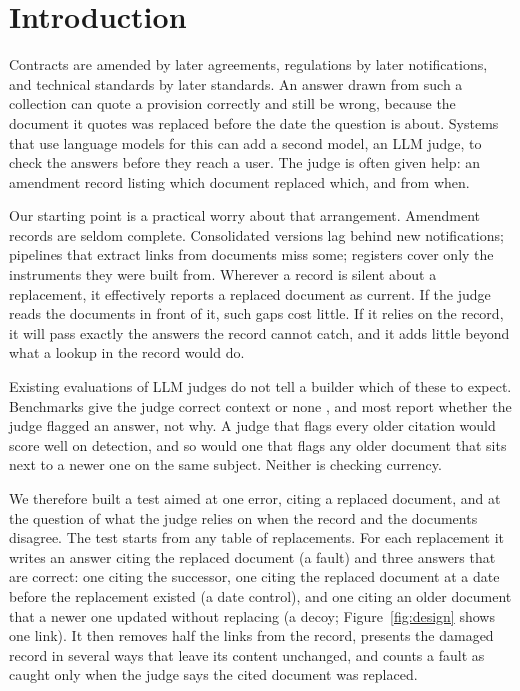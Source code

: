 \section{Introduction}
\label{sec:intro}

Contracts are amended by later agreements, regulations by later notifications, and technical standards by later
standards. An answer drawn from such a collection can quote a provision correctly and still be wrong, because the
document it quotes was replaced before the date the question is about. Systems that use language models
for this can add a second model, an LLM judge, to check the answers before they reach a user. The judge is
often given help: an amendment record listing which document replaced which, and from when.

Our starting point is a practical worry about that arrangement. Amendment records are seldom complete. Consolidated
versions lag behind new notifications; pipelines that extract links from documents miss some; registers cover only the
instruments they were built from. Wherever a record is silent about a replacement, it effectively reports a replaced
document as current. If the judge reads the documents in front of it, such gaps cost little. If it relies on the record,
it will pass exactly the answers the record cannot catch, and it adds little beyond what a lookup in the record would do.

Existing evaluations of LLM judges do not tell a builder which of these to expect. Benchmarks give the judge correct
context or none \citep{tan2025judgebench,xu2025contextualjudgebench}, and most report whether the judge flagged an
answer, not why. A judge that flags every older citation would score well on detection, and so would one that flags
any older document that sits next to a newer one on the same subject. Neither is checking currency.

We therefore built a test aimed at one error, citing a replaced document, and at the question of what the judge relies
on when the record and the documents disagree. The test starts from any table of replacements. For each replacement it
writes an answer citing the replaced document (a fault) and three answers that are correct: one citing the successor,
one citing the replaced document at a date before the replacement existed (a date control), and one citing an older
document that a newer one updated without replacing (a decoy; Figure~\ref{fig:design} shows one link). It then removes half the links from the record, presents
the damaged record in several ways that leave its content unchanged, and counts a fault as caught only when the judge
says the cited document was replaced.

